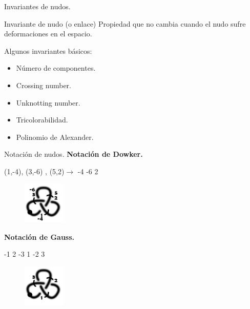 \documentclass{beamer}
\begin{document}
\begin{frame}{Invariantes de nudos.}
	\begin{block}{Invariante de nudo (o enlace)}
		Propiedad que no cambia cuando el nudo sufre deformaciones en el espacio.
	\end{block}
	Algunos invariantes básicos:
	\begin{itemize}
		\item Número de componentes.
		\item Crossing number. 
		\item Unknotting number. 
		\item Tricolorabilidad.
		\item Polinomio de Alexander. 
	\end{itemize}
\end{frame}

\begin{frame}{Notación de nudos.}
\textbf{ Notación de Dowker. }
	\begin{exampleblock}{(1,-4), (3,-6) , (5,2)$  \rightarrow $ -4 -6 2}
	\begin{figure}[h!]
		\includegraphics[width=2cm]{imagenes/3fcon2dow.png}
	\end{figure}
	\end{exampleblock}
	
\textbf{ Notación de Gauss. }
	\begin{exampleblock}{-1 2 -3 1 -2 3}
		\begin{figure}[h!]
			\includegraphics[width=2cm]{imagenes/3fcon2gaus.png} 
		\end{figure}
	\end{exampleblock}

\end{frame}
\end{document}
